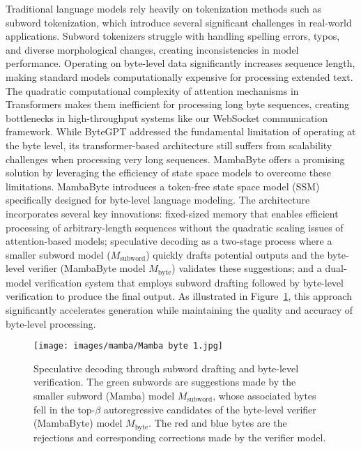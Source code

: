 \documentclass[a4paper, 11pt, twoside, openright]{report}
\begin{document}
Traditional language models rely heavily on tokenization methods such as subword tokenization, which introduce several significant challenges in real-world applications. Subword tokenizers struggle with handling spelling errors, typos, and diverse morphological changes, creating inconsistencies in model performance. Operating on byte-level data significantly increases sequence length, making standard models computationally expensive for processing extended text. The quadratic computational complexity of attention mechanisms in Transformers makes them inefficient for processing long byte sequences, creating bottlenecks in high-throughput systems like our WebSocket communication framework. While ByteGPT addressed the fundamental limitation of operating at the byte level, its transformer-based architecture still suffers from scalability challenges when processing very long sequences. MambaByte \cite{MambaByte2024} offers a promising solution by leveraging the efficiency of state space models to overcome these limitations. MambaByte introduces a token-free state space model (SSM) specifically designed for byte-level language modeling. The architecture incorporates several key innovations: fixed-sized memory that enables efficient processing of arbitrary-length sequences without the quadratic scaling issues of attention-based models; speculative decoding as a two-stage process where a smaller subword model ($M_{\text{subword}}$) quickly drafts potential outputs and the byte-level verifier (MambaByte model $M_{\text{byte}}$) validates these suggestions; and a dual-model verification system that employs subword drafting followed by byte-level verification to produce the final output. As illustrated in Figure~\ref{fig:mambabyte_architecture}, this approach significantly accelerates generation while maintaining the quality and accuracy of byte-level processing.

\begin{figure}[h] \centering \texttt{[image: images/mamba/Mamba byte 1.jpg]} \caption{Speculative decoding through subword drafting and byte-level verification. The green subwords are suggestions made by the smaller subword (Mamba) model $M_{\text{subword}}$, whose associated bytes fell in the top-$\beta$ autoregressive candidates of the byte-level verifier (MambaByte) model $M_{\text{byte}}$. The red and blue bytes are the rejections and corresponding corrections made by the verifier model.} \label{fig:mambabyte_architecture} \end{figure}
\end{document}
